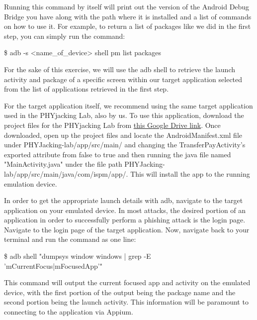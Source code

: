 \documentclass[letterpaper,12pt]{report}
\begin{document}
Running this command by itself will print out the version of the Android Debug Bridge you have along with the path where it is installed and a list of commands on how to use it. For example, to return a list of packages like we did in the first step, you can simply run the command:

\bigskip
\begin{mdframed}[backgroundcolor=black!12,style=code,nobreak=true,align=center,userdefinedwidth=14cm]
    \$ adb -s <name\_of\_device> shell pm list packages
\end{mdframed}

For the sake of this exercise, we will use the adb shell to retrieve the launch activity and package of a specific screen within our target application selected from the list of applications retrieved in the first step. 

For the target application itself, we recommend using the same target application used in the PHYjacking Lab, also by us. To use this application, download the project files for the PHYjacking Lab from \href{https://drive.google.com/file/d/1ACYQ1qE1wGhfaAeTw7Pt6uyXI6C_BEKZ/view?usp=share_link}{this Google Drive link}. Once downloaded, open up the project files and locate the AndroidManifest.xml file under PHYJacking-lab/app/src/main/ and changing the TransferPayActivity's exported attribute from false to true and then running the java file named "MainActivity.java" under the file path PHYJacking-lab/app/src/main/java/com/ispm/app/. This will install the app to the running emulation device.

In order to get the appropriate launch details with adb, navigate to the target application on your emulated device. In most attacks, the desired portion of an application in order to successfully perform a phishing attack is the login page. Navigate to the login page of the target application. Now, navigate back to your terminal and run the command as one line:

\bigskip
\begin{mdframed}[backgroundcolor=black!12,style=code,nobreak=true,align=center,userdefinedwidth=14cm]
    \$ adb shell "dumpsys window windows | grep -E \\  'mCurrentFocus|mFocusedApp'"
\end{mdframed}

This command will output the current focused app and activity on the emulated device, with the first portion of the output being the package name and the second portion being the launch activity. This information will be paramount to connecting to the application via Appium.
\end{document}
